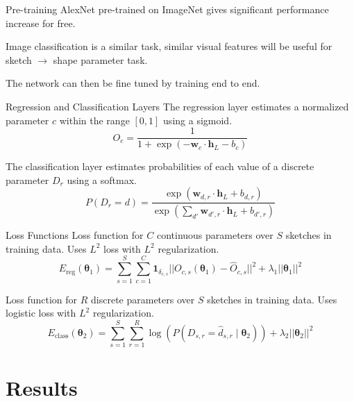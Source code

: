 \documentclass{beamer}
\begin{document}
    \begin{frame}{Pre-training}
        AlexNet pre-trained on ImageNet gives significant performance increase for free. 
        
        Image classification is a similar task, similar visual features will be useful for sketch $\to$ shape parameter task.
        
        The network can then be fine tuned by training end to end.
        
    \end{frame}
    
    \begin{frame}{Regression and Classification Layers}
        The regression layer estimates a normalized parameter $c$ within the range $[0,1]$ using a sigmoid.
        $$
        O_c = \frac{1}{1+\exp(-\mathbf{w}_c \cdot \mathbf{h}_L -b_c)}
        $$
        
        The classification layer estimates probabilities of each value of a discrete parameter $D_r$ using a softmax.
        $$
        P(D_r = d) =
        \frac{\exp(\mathbf{w}_{d,r} \cdot \mathbf{h}_L + b_{d,r})}
        {\exp(\sum_{d'}\mathbf{w}_{d',r} \cdot \mathbf{h}_L + b_{d',r})}
        $$
    \end{frame}
    
    
    \begin{frame}{Loss Functions}
    Loss function for $C$ continuous parameters over $S$ sketches in training data. Uses $L^2$ loss with $L^2$ regularization.
    $$
    E_\text{reg}(\mathbf{\theta}_1) = 
    \sum_{s=1}^{S} \sum_{c=1}^{C} \mathbf{1}_{\delta_{c,s}} 
    || O_{c,s}(\mathbf{\theta}_1) - \hat O_{c,s} ||^2
    + \lambda_1 || \mathbf{\theta}_1 ||^2
    $$
    
    Loss function for $R$ discrete parameters over $S$ sketches in training data. Uses logistic loss with $L^2$ regularization.
    $$
    E_\text{class}(\mathbf{\theta}_2) = 
    \sum_{s=1}^{S} \sum_{r=1}^{R} \log(P(D_{s,r} = \hat d_{s,r} \mid \mathbf{\theta}_2))
    + \lambda_2 || \mathbf{\theta}_2 ||^2
    $$
        
    \end{frame}
    
    \section{Results}
    
\end{document}
